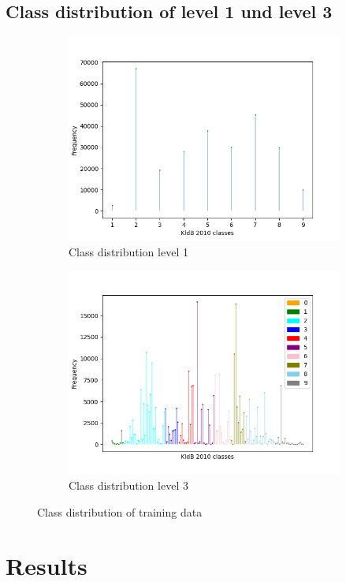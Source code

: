 \documentclass[12pt, a4paper, titlepage]{article}
\begin{document}
\subsection{Class distribution of level 1 und level 3}
\begin{figure}[hb!]
  \begin{subfigure}{.5\textwidth}
    \centering
    \includegraphics[width=.9\linewidth]{training_data_long_L1.png}
    \caption{\label{fig: F11} Class distribution level 1}
  \end{subfigure}%
  \begin{subfigure}{.5\textwidth}
    \centering
    \includegraphics[width=.9\linewidth]{training_data_long_L3.png}
    \caption{\label{fig: F12} Class distribution level 3}
  \end{subfigure}
  \caption{Class distribution of training data}
  \end{figure}


  


\section{Results}
\end{document}
